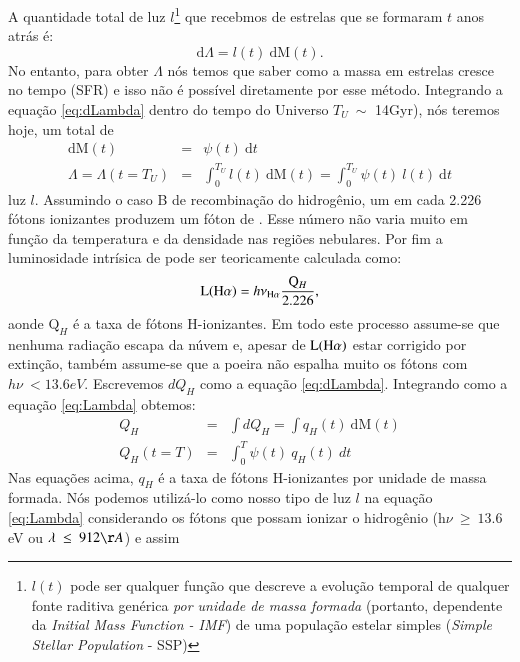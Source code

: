 A quantidade total de luz $l$\footnote{$l(t)$ pode ser qualquer função que descreve a evolução
temporal de qualquer fonte raditiva genérica \emph{por unidade de massa formada} (portanto,
dependente da {\em Initial Mass Function - IMF}) de uma população estelar simples ({\em Simple
Stellar Population} - SSP)} que recebmos de estrelas que se formaram $t$ anos atrás é:
\begin{equation}
	\mathrm{d}\Lambda = l(t)\ \mathrm{d}\mathrm{M}(t).
	\label{eq:dLambda}
\end{equation}
\noindent No entanto, para obter $\Lambda$ nós temos que saber como a massa em estrelas cresce no
tempo (SFR) e isso não é possível diretamente por esse método. Integrando a equação
\eqref{eq:dLambda} dentro do tempo do Universo $T_U\ \sim$ 14Gyr), nós teremos hoje, um total de 
\begin{eqnarray}
	\mathrm{d}\mathrm{M}(t) &=& \psi(t)\ \mathrm{d}t \\
	\Lambda = \Lambda(t = T_U) &=& \int_0^{T_U} l(t)\ \textrm{d}\textrm{M}(t) = \int_0^{T_U} \psi(t)\
	l(t)\ \textrm{d}t
	\label{eq:Lambda}
\end{eqnarray}
\noindent luz $l$. Assumindo o caso B de recombinação do hidrogênio, um em cada 2.226 fótons
ionizantes produzem um fóton de \Halpha. Esse número não varia muito em função da temperatura e da
densidade nas regiões nebulares. Por fim a luminosidade intrísica de \Halpha pode ser teoricamente
calculada como:
\begin{equation}
	\mathrm{L}(\Halpha) = h \nu_{\Halpha} \frac{\mathrm{Q}_H}{2.226},
	\label{eq:LHa_recomb_theory}
\end{equation}
\noindent aonde $\mathrm{Q}_H$ é a taxa de fótons H-ionizantes. Em todo este processo
assume-se que nenhuma radiação escapa da núvem e, apesar de $\mathrm{L}(\Halpha)$ estar corrigido
por extinção, também assume-se que a poeira não espalha muito os fótons com $h\nu\ < 13.6 eV$.
Escrevemos $dQ_H$ como a equação \eqref{eq:dLambda}. Integrando como a equação \eqref{eq:Lambda}
obtemos:
\begin{eqnarray}
	Q_H &=& \int dQ_H = \int q_H(t)\ \mathrm{d}\mathrm{M}(t) \\ 
	Q_H(t = T) &=& \int_0^T \psi(t)\ q_H(t)\ dt
	\label{eq:QH}
\end{eqnarray}
\noindent Nas equações acima, $q_H$ é a taxa de fótons H-ionizantes por unidade de massa formada.
Nós podemos utilizá-lo como nosso tipo de luz $l$ na equação \eqref{eq:Lambda} considerando os
fótons que possam ionizar o hidrogênio (h$\nu\ \geq\ 13.6$ eV ou $\lambda\ \leq\ 912\AA$) e assim
